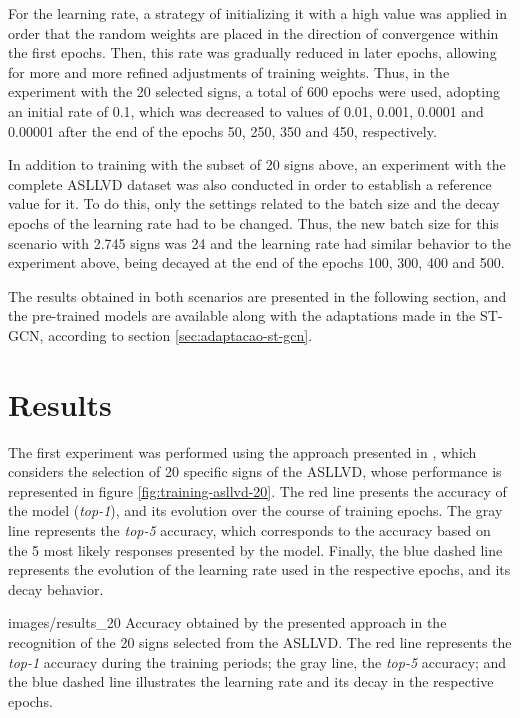 For the learning rate, a strategy of initializing it with a high value was applied in order that the random weights are placed in the direction of convergence within the first epochs. Then, this rate was gradually reduced in later epochs, allowing for more and more refined adjustments of training weights. Thus, in the experiment with the 20 selected signs, a total of 600 epochs were used, adopting an initial rate of 0.1, which was decreased to values of 0.01, 0.001, 0.0001 and 0.00001 after the end of the epochs 50, 250, 350 and 450, respectively.

In addition to training with the subset of 20 signs above, an experiment with the complete ASLLVD dataset was also conducted in order to establish a reference value for it. To do this, only the settings related to the batch size and the decay epochs of the learning rate had to be changed. Thus, the new batch size for this scenario with 2.745 signs was 24 and the learning rate had similar behavior to the experiment above, being decayed at the end of the epochs 100, 300, 400 and 500.

The results obtained in both scenarios are presented in the following section, and the pre-trained models are available along with the adaptations made in the ST-GCN, according to section \ref{sec:adaptacao-st-gcn}.


\section{Results} 
\label{sec:resultados}

The first experiment was performed using the approach presented in \cite{lim-2016}, which considers the selection of 20 specific signs of the ASLLVD, whose performance is represented in figure \ref{fig:training-asllvd-20}. The red line presents the accuracy of the model (\textit{top-1}), and its evolution over the course of training epochs. The gray line represents the \textit{top-5} accuracy, which corresponds to the accuracy based on the 5 most likely responses presented by the model. Finally, the blue dashed line represents the evolution of the learning rate used in the respective epochs, and its decay behavior.

    {images/results_20}
    {Accuracy obtained by the presented approach in the recognition of the 20 signs selected from the ASLLVD. The red line represents the \textit{top-1} accuracy during the training periods; the gray line, the \textit{top-5} accuracy; and the blue dashed line illustrates the learning rate and its decay in the respective epochs.}


